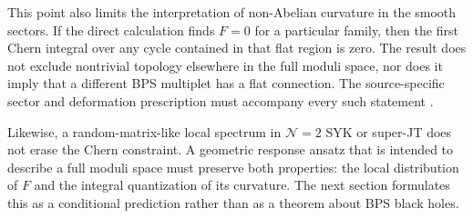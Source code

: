 This point also limits the interpretation of non-Abelian curvature in the
smooth sectors.  If the direct calculation finds $F=0$ for a particular
family, then the first Chern integral over any cycle contained in that flat
region is zero.  The result does not exclude nontrivial topology elsewhere in
the full moduli space, nor does it imply that a different BPS multiplet has a
flat connection.  The source-specific sector and deformation prescription
must accompany every such statement \cite{chen2026berry}.

Likewise, a random-matrix-like local spectrum in $\mathcal{N}=2$ SYK or
super-JT does not erase the Chern constraint.  A geometric response ansatz
that is intended to describe a full moduli space must preserve both properties:
the local distribution of $F$ and the integral quantization of its curvature.
The next section formulates this as a conditional prediction rather than as a
theorem about BPS black holes.
